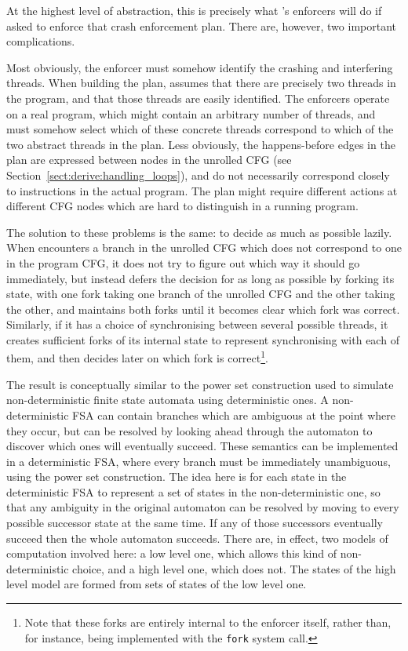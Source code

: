 At the highest level of abstraction, this is precisely what
{\implementation}'s enforcers will do if asked to enforce that crash
enforcement plan.  There are, however, two important complications.

Most obviously, the enforcer must somehow identify the crashing and
interfering threads.  When building the plan, {\technique} assumes
that there are precisely two threads in the program, and that those
threads are easily identified.  The enforcers operate on a real
program, which might contain an arbitrary number of threads, and must
somehow select which of these concrete threads correspond to which of
the two abstract threads in the plan.  Less obviously, the
happens-before edges in the plan are expressed between nodes in the
unrolled CFG (see Section~\ref{sect:derive:handling_loops}), and do
not necessarily correspond closely to instructions in the actual
program.  The plan might require different actions at different CFG
nodes which are hard to distinguish in a running program.

The solution to these problems is the same: to decide as much as
possible lazily.  When {\implementation} encounters a branch in the
unrolled CFG which does not correspond to one in the program CFG, it
does not try to figure out which way it should go immediately, but
instead defers the decision for as long as possible by forking its
state, with one fork taking one branch of the unrolled CFG and the
other taking the other, and maintains both forks until it becomes
clear which fork was correct.  Similarly, if it has a choice of
synchronising between several possible threads, it creates sufficient
forks of its internal state to represent synchronising with each of
them, and then decides later on which fork is correct\footnote{Note
  that these forks are entirely internal to the enforcer itself,
  rather than, for instance, being implemented with the \texttt{fork}
  system call.}.

The result is conceptually similar to the power set construction used
to simulate non-deterministic finite state automata using
deterministic ones\needCite{}.  A non-deterministic FSA can contain
branches which are ambiguous at the point where they occur, but can be
resolved by looking ahead through the automaton to discover which ones
will eventually succeed.  These semantics can be implemented in a
deterministic FSA, where every branch must be immediately unambiguous,
using the power set construction.  The idea here is for each state in
the deterministic FSA to represent a set of states in the
non-deterministic one, so that any ambiguity in the original automaton
can be resolved by moving to every possible successor state at the
same time.  If any of those successors eventually succeed then the
whole automaton succeeds.  There are, in effect, two models of
computation involved here: a low level one, which allows this kind of
non-deterministic choice, and a high level one, which does not.  The
states of the high level model are formed from sets of states of the
low level one.

